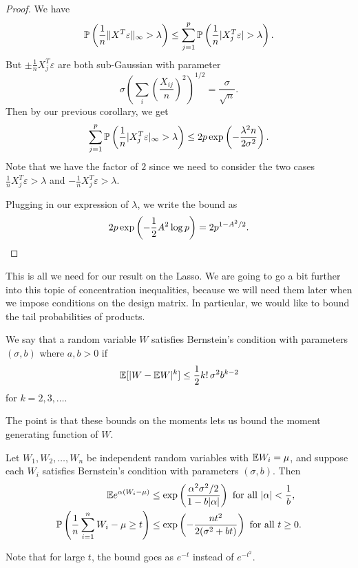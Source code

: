 \documentclass[a4paper]{article}
\begin{document}
\begin{proof}
  We have
  \[
    \P\left(\frac{1}{n}\|X^T \varepsilon\|_{\infty} > \lambda \right) \leq \sum_{j = 1}^p \P\left(\frac{1}{n} |X_j^T \varepsilon| > \lambda\right).
  \]
  But $\pm \frac{1}{n} X_j^T \varepsilon$ are both sub-Gaussian with parameter
  \[
    \sigma \left(\sum_i \left(\frac{X_{ij}}{n}\right)^2\right)^{1/2} = \frac{\sigma}{\sqrt{n}}.
  \]
  Then by our previous corollary, we get
  \[
    \sum_{j = 1}^p \P\left(\frac{1}{n} |X_j^T \varepsilon|_\infty > \lambda\right) \leq 2p \exp \left(- \frac{\lambda^2 n}{2\sigma^2}\right).
  \]
  Note that we have the factor of $2$ since we need to consider the two cases $\frac{1}{n} X_j^T \varepsilon > \lambda$ and $-\frac{1}{n} X_j^T \varepsilon > \lambda$.

  Plugging in our expression of $\lambda$, we write the bound as
  \[
    2p \exp\left(-\frac{1}{2} A^2 \log p\right) = 2p^{1 - A^2/2}.\qedhere
  \]
\end{proof}
This is all we need for our result on the Lasso. We are going to go a bit further into this topic of concentration inequalities, because we will need them later when we impose conditions on the design matrix. In particular, we would like to bound the tail probabilities of products.

\begin{defi}
  We say that a random variable $W$ satisfies Bernstein's condition with parameters $(\sigma, b)$ where $a, b > 0$ if
  \[
    \E[|W - \E W|^k] \leq \frac{1}{2} k!\, \sigma^2 b^{k - 2}
  \]
  for $k = 2, 3, \ldots$.
\end{defi}
The point is that these bounds on the moments lets us bound the moment generating function of $W$.

\begin{prop}
  Let $W_1, W_2, \ldots, W_n$ be independent random variables with $\E W_i = \mu$, and suppose each $W_i$ satisfies Bernstein's condition with parameters $(\sigma, b)$. Then
  \begin{align*}
    \E e^{\alpha(W_i - \mu)} &\leq \exp \left(\frac{\alpha^2 \sigma^2/2}{1 - b|\alpha|}\right)\text{ for all }|\alpha| < \frac{1}{b},\\
    \P\left(\frac{1}{n} \sum_{i = 1}^n W_i - \mu \geq t\right) &\leq \exp \left(-\frac{nt^2}{2 (\sigma^2 + bt)}\right)\text{ for all } t \geq 0.
  \end{align*}
\end{prop}
Note that for large $t$, the bound goes as $e^{-t}$ instead of $e^{-t^2}$.
\end{document}
